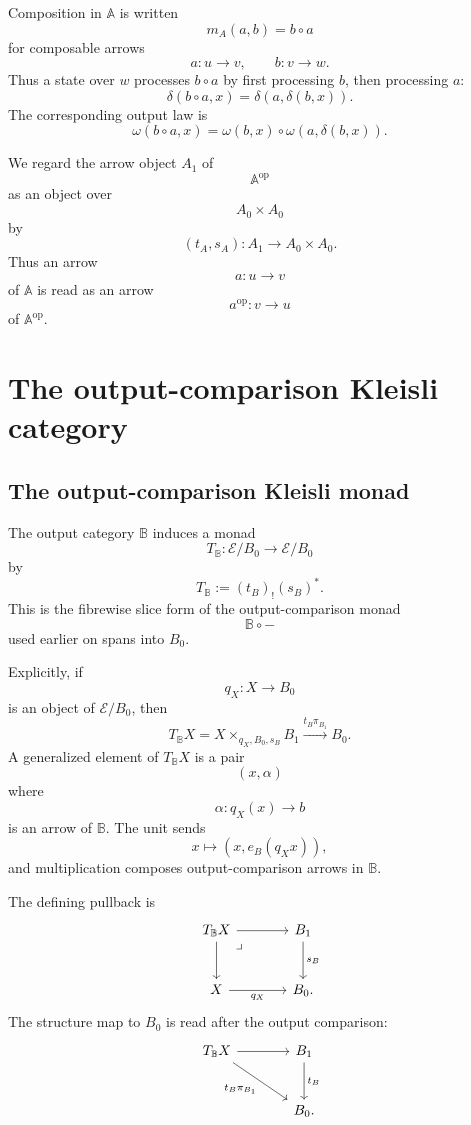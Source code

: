 Composition in \(\mathbb A\) is written
\[
    m_A(a,b)=b\circ a
\]
for composable arrows
\[
    a:u\to v,
    \qquad
    b:v\to w.
\]
Thus a state over \(w\) processes \(b\circ a\) by first processing \(b\), then
processing \(a\):
\[
    \delta(b\circ a,x)
    =
    \delta(a,\delta(b,x)).
\]
The corresponding output law is
\[
    \omega(b\circ a,x)
    =
    \omega(b,x)\circ\omega(a,\delta(b,x)).
\]

We regard the arrow object \(A_1\) of
\[
    \mathbb A^{\mathrm{op}}
\]
as an object over
\[
    A_0\times A_0
\]
by
\[
    (t_A,s_A):A_1\to A_0\times A_0.
\]
Thus an arrow
\[
    a:u\to v
\]
of \(\mathbb A\) is read as an arrow
\[
    a^{\mathrm{op}}:v\to u
\]
of \(\mathbb A^{\mathrm{op}}\).

\section{The output-comparison Kleisli category}
\label{sec:to-output-comparison-kleisli-endomorphisms}

\subsection{The output-comparison Kleisli monad}
\label{subsec:to-output-comparison-kleisli-monad}

The output category \(\mathbb B\) induces a monad
\[
    T_{\mathbb B}:\mathcal E/B_0\to\mathcal E/B_0
\]
by
\[
    T_{\mathbb B}:=(t_B)_!(s_B)^*.
\]
This is the fibrewise slice form of the output-comparison monad
\[
    \mathbb B\circ -
\]
used earlier on spans into \(B_0\).

Explicitly, if
\[
    q_X:X\to B_0
\]
is an object of \(\mathcal E/B_0\), then
\[
    T_{\mathbb B}X
    =
    X\times_{q_X,B_0,s_B}B_1
    \xrightarrow{t_B\pi_{B_1}}
    B_0.
\]
A generalized element of \(T_{\mathbb B}X\) is a pair
\[
    (x,\alpha)
\]
where
\[
    \alpha:q_X(x)\to b
\]
is an arrow of \(\mathbb B\). The unit sends
\[
    x\longmapsto (x,e_B(q_Xx)),
\]
and multiplication composes output-comparison arrows in \(\mathbb B\).

The defining pullback is
\[
\begin{tikzcd}[column sep=large, row sep=large]
    T_{\mathbb B}X
        \arrow[r]
        \arrow[d]
        \arrow[dr, phantom, "\lrcorner", very near start]
    &
    B_1
        \arrow[d, "s_B"]
    \\
    X
        \arrow[r, "q_X"']
    &
    B_0 .
\end{tikzcd}
\]
The structure map to \(B_0\) is read after the output comparison:
\[
\begin{tikzcd}[column sep=large, row sep=large]
    T_{\mathbb B}X
        \arrow[r]
        \arrow[dr, "{t_B\pi_{B_1}}"']
    &
    B_1
        \arrow[d, "t_B"]
    \\
    &
    B_0 .
\end{tikzcd}
\]

